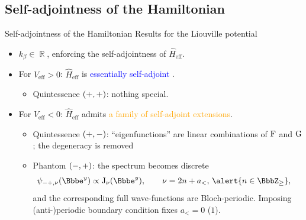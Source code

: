 \documentclass[8pt]{beamer}
\begin{document}
\subsection{Self-adjointness of the Hamiltonian}

\begin{frame}%
{Self-adjointness of the Hamiltonian}%
{Results for the Liouville potential}
\begin{itemize}
\item $k_\beta \in \BbbR$, enforcing the self-adjointness of 
$\widehat{H}_{\text{eff}}$.

\item For $V_{\text{eff}} > 0$: $\widehat{H}_\text{eff}$ is
\textcolor{blue}{essentially self-adjoint}%
.
\begin{itemize}
\item Quintessence ${\left(+, +\right)}$: nothing special.
\end{itemize}

\item For $V_{\text{eff}} < 0$: $\widehat{H}_\text{eff}$ admits
\textcolor{orange}{a family of self-adjoint extensions}.
\begin{itemize}
\item Quintessence ${\left(+,-\right)}$: ``eigenfunctions'' are
linear combinations of $\operatorname{F}$ and $\operatorname{G}$;
\alert{the degeneracy is removed}
\item Phantom ${\left(-, +\right)}$: the spectrum becomes \alert{discrete}
\begin{align}
\rfun{\psi_{-+,\nu}}{\ee^y} &\propto
\rfun{\BesselJ_{\nu}}{\ee^y},\qquad \nu = 2n+a_<,\, \alert{n \in
\BbbZ_\ge},
\label{eq:Phi_nu}
\end{align}
and the corresponding full wave-functions are Bloch-periodic.
Imposing (anti-)periodic boundary condition fixes $a_< = 0$ ($1$).
\end{itemize}





\end{itemize}
\end{frame}
\end{document}
